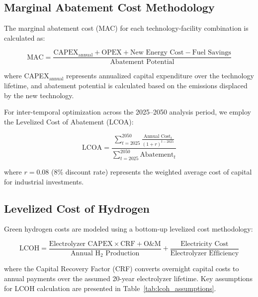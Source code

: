\documentclass[12pt,a4paper]{article}
\begin{document}
\subsection{Marginal Abatement Cost Methodology}

The marginal abatement cost (MAC) for each technology-facility combination is calculated as:

\begin{equation}
\text{MAC} = \frac{\text{CAPEX}_{\text{annual}} + \text{OPEX} + \text{New Energy Cost} - \text{Fuel Savings}}{\text{Abatement Potential}}
\label{eq:mac}
\end{equation}

where CAPEX$_{\text{annual}}$ represents annualized capital expenditure over the technology lifetime, and abatement potential is calculated based on the emissions displaced by the new technology.

For inter-temporal optimization across the 2025--2050 analysis period, we employ the Levelized Cost of Abatement (LCOA):

\begin{equation}
\text{LCOA} = \frac{\sum_{t=2025}^{2050} \frac{\text{Annual Cost}_t}{(1+r)^{t-2025}}}{\sum_{t=2025}^{2050} \text{Abatement}_t}
\label{eq:lcoa}
\end{equation}

where $r = 0.08$ (8\% discount rate) represents the weighted average cost of capital for industrial investments.

\subsection{Levelized Cost of Hydrogen}

Green hydrogen costs are modeled using a bottom-up levelized cost methodology:

\begin{equation}
\text{LCOH} = \frac{\text{Electrolyzer CAPEX} \times \text{CRF} + \text{O\&M}}{\text{Annual H}_2\text{ Production}} + \frac{\text{Electricity Cost}}{\text{Electrolyzer Efficiency}}
\label{eq:lcoh}
\end{equation}

where the Capital Recovery Factor (CRF) converts overnight capital costs to annual payments over the assumed 20-year electrolyzer lifetime. Key assumptions for LCOH calculation are presented in Table~\ref{tab:lcoh_assumptions}.
\end{document}
